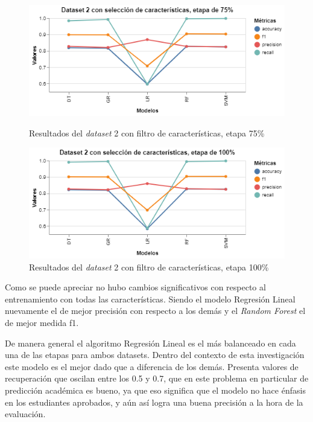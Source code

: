 \begin{figure}[htbp]
    \centering
    \begin{minipage}[t]{0.50\textwidth}
        \centering
        \includegraphics[width = \textwidth]{Graphics/dataset_2_fs_75.png}
        \caption{Resultados del \textit{dataset} 2 con filtro de características, etapa 75\%}
        \label{dataset2_fs_75}
    \end{minipage}\hfill
    \begin{minipage}[t]{0.50\textwidth}
        \centering
        \includegraphics[width = \textwidth]{Graphics/dataset_2_fs_100.png}
        \caption{Resultados del \textit{dataset} 2 con filtro de características, etapa 100\%}
        \label{dataset2_fs_100}
    \end{minipage}
\end{figure}

Como se puede apreciar no hubo cambios significativos con respecto al entrenamiento con todas las características.  Siendo el modelo Regresión Lineal nuevamente el de mejor precisión con respecto a los demás y el \textit{Random Forest} el de mejor medida f1. 

De manera general el algoritmo Regresión Lineal es el más balanceado en cada una de las etapas para ambos datasets. Dentro del contexto de esta investigación este modelo es el mejor dado que a diferencia de los demás. 
Presenta valores de recuperación que oscilan entre los 0.5 y 0.7, que en este problema en 
particular de predicción académica es bueno, ya que eso significa que el modelo no hace énfasis en los estudiantes aprobados, y aún así logra una buena precisión a la hora de la evaluación. 


